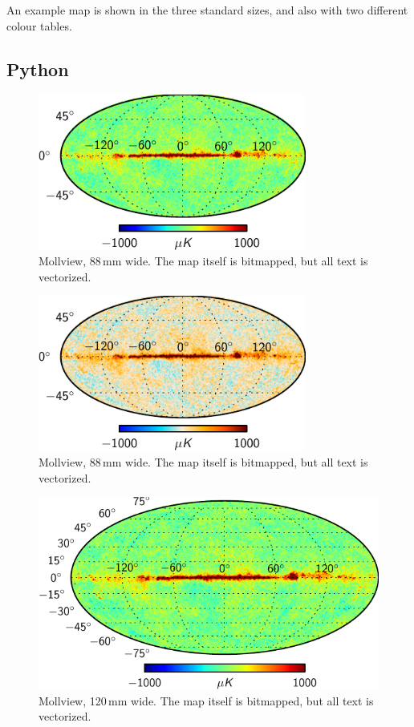 \documentclass[traditabstract]{aa}
\begin{document}
An example map is shown in the three standard sizes, and also with two different colour tables.


\subsection{Python}


\begin{figure}[ht]
\includegraphics[width=8.8cm]{PlanckFig_map_python_88mm}
\caption{Mollview, 88\,mm wide.  The map itself is bitmapped, but all text is vectorized.} 
\label{fig:map_python88} 
\end{figure}

\begin{figure}[ht]
\includegraphics[width=8.8cm]{PlanckFig_map_colombi1_python_88mm}
\caption{Mollview, 88\,mm wide.  The map itself is bitmapped, but all text is vectorized.} 
\label{fig:map_parchment_python88}
\end{figure}



\begin{figure}[ht]
\sidecaption
\includegraphics[width=12cm]{PlanckFig_map_python_120mm}
\caption{Mollview, 120\,mm wide.  The map itself is bitmapped, but all text is vectorized.}
\label{fig:map_python120} 
\end{figure}
\end{document}
